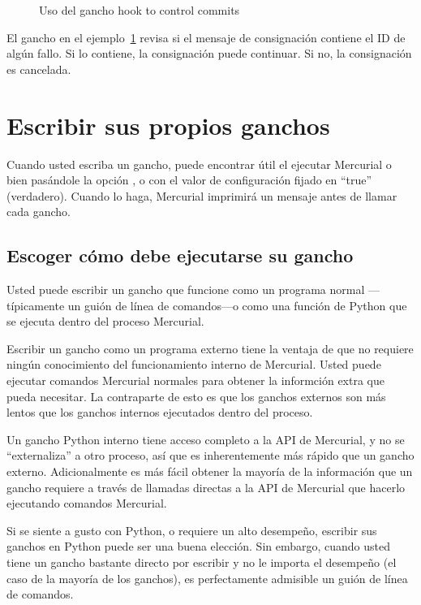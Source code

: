 \begin{figure}[ht]
  \caption{Uso del gancho  hook to control commits}
  \label{ex:hook:pretxncommit}
\end{figure}

El gancho en el ejemplo~\ref{ex:hook:pretxncommit} revisa si el
mensaje de consignación contiene el ID de algún fallo. Si lo contiene,
la consignación puede continuar. Si no, la consignación es cancelada.

\section{Escribir sus propios ganchos}

Cuando usted escriba un gancho, puede encontrar útil el ejecutar
Mercurial o bien pasándole la opción , o con el valor de
configuración  fijado en ``true'' (verdadero).
Cuando lo haga, Mercurial imprimirá un mensaje antes de llamar cada
gancho.

\subsection{Escoger cómo debe ejecutarse su gancho}
\label{sec:hook:lang}

Usted puede escribir un gancho que funcione como un programa normal
---típicamente un guión de línea de comandos---o como una función de
Python que se ejecuta dentro del proceso Mercurial.

Escribir un gancho como un programa externo tiene la ventaja de que no
requiere ningún conocimiento del funcionamiento interno de Mercurial.
Usted puede ejecutar comandos Mercurial normales para obtener la
informción extra que pueda necesitar. La contraparte de esto es que
los ganchos externos son más lentos que los ganchos internos
ejecutados dentro del proceso.

Un gancho Python interno tiene acceso completo a la API de Mercurial,
y no se ``externaliza'' a otro proceso, así que es inherentemente más
rápido que un gancho externo. Adicionalmente es más fácil obtener la
mayoría de la información que un gancho requiere a través de llamadas
directas a la API de Mercurial que hacerlo ejecutando comandos
Mercurial.

Si se siente a gusto con Python, o requiere un alto desempeño,
escribir sus ganchos en Python puede ser una buena elección. Sin
embargo, cuando usted tiene un gancho bastante directo por escribir y
no le importa el desempeño (el caso de la mayoría de los ganchos), es
perfectamente admisible un guión de línea de comandos.

